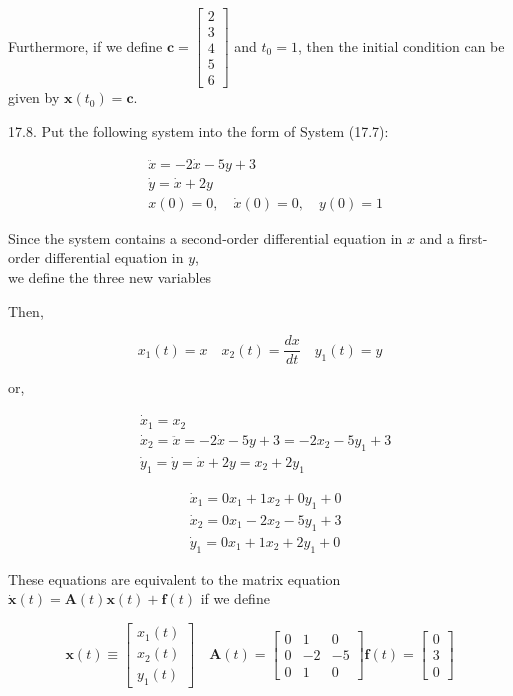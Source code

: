 \documentclass[10pt]{article}
\begin{document}
Furthermore, if we define $\mathbf{c}=\left[\begin{array}{l}2 \\ 3 \\ 4 \\ 5 \\ 6\end{array}\right]$ and $t_{0}=1$, then the initial condition can be given by $\mathbf{x}\left(t_{0}\right)=\mathbf{c}$.

17.8. Put the following system into the form of System (17.7):

$$
\begin{aligned}
& \ddot{x}=-2 \dot{x}-5 y+3 \\
& \dot{y}=\dot{x}+2 y \\
& x(0)=0, \quad \dot{x}(0)=0, \quad y(0)=1
\end{aligned}
$$

Since the system contains a second-order differential equation in $x$ and a first-order differential equation in $y$,\\
we define the three new variables

Then,

$$
x_{1}(t)=x \quad x_{2}(t)=\frac{d x}{d t} \quad y_{1}(t)=y
$$

or,

$$
\begin{aligned}
& \dot{x}_{1}=x_{2} \\
& \dot{x}_{2}=\ddot{x}=-2 \dot{x}-5 y+3=-2 x_{2}-5 y_{1}+3 \\
& \dot{y}_{1}=\dot{y}=\dot{x}+2 y=x_{2}+2 y_{1}
\end{aligned}
$$

$$
\begin{aligned}
& \dot{x}_{1}=0 x_{1}+1 x_{2}+0 y_{1}+0 \\
& \dot{x}_{2}=0 x_{1}-2 x_{2}-5 y_{1}+3 \\
& \dot{y}_{1}=0 x_{1}+1 x_{2}+2 y_{1}+0
\end{aligned}
$$

These equations are equivalent to the matrix equation $\dot{\mathbf{x}}(t)=\mathbf{A}(t) \mathbf{x}(t)+\mathbf{f}(t)$ if we define

$$
\mathbf{x}(t) \equiv\left[\begin{array}{l}
x_{1}(t) \\
x_{2}(t) \\
y_{1}(t)
\end{array}\right] \quad \mathbf{A}(t)=\left[\begin{array}{rrr}
0 & 1 & 0 \\
0 & -2 & -5 \\
0 & 1 & 0
\end{array}\right] \mathbf{f}(t)=\left[\begin{array}{l}
0 \\
3 \\
0
\end{array}\right]
$$
\end{document}

